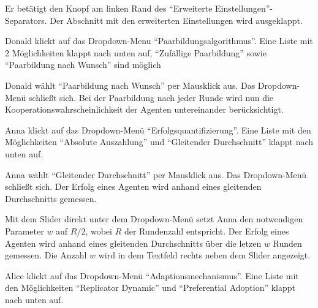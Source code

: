 \documentclass[parskip=full,11pt]{scrartcl}
\begin{document}

{Er betätigt den Knopf am linken Rand des \enquote{Erweiterte Einstellungen}-Separators.}
{Der Abschnitt mit den erweiterten Einstellungen wird ausgeklappt.}

{Donald klickt auf das Dropdown-Menu \enquote{Paarbildungsalgorithmus}.}
{Eine Liste mit 2 Möglichkeiten klappt nach unten auf, \enquote{Zufällige Paarbildung} sowie \enquote{Paarbildung nach Wunsch} sind möglich}

{Donald wählt  \enquote{Paarbildung nach Wunsch} per Mausklick aus.}
{Das Dropdown-Menü schließt sich. Bei der Paarbildung nach jeder Runde wird nun die Kooperationswahrscheinlichkeit der Agenten untereinander berücksichtigt.}


{Anna klickt auf das Dropdown-Menü \enquote{Erfolgsquantifizierung}.}
{Eine Liste mit den Möglichkeiten \enquote{Absolute Auszahlung} und  \enquote{Gleitender Durchschnitt} klappt nach unten auf.}

{Anna wählt \enquote{Gleitender Durchschnitt} per Mausklick aus.}
{Das Dropdown-Menü schließt sich. Der Erfolg eines Agenten wird anhand eines gleitenden Durchschnitts gemessen.}

{Mit dem Slider direkt unter dem Dropdown-Menü setzt Anna den notwendigen Parameter \(w\) auf \(R/2\), wobei \(R\) der Rundenzahl entspricht.}
{Der Erfolg eines Agenten wird anhand eines gleitenden Durchschnitts über die letzen \(w\) Runden gemessen. Die Anzahl \(w\) wird in dem Textfeld rechts neben dem Slider angezeigt.}


{Alice klickt auf das Dropdown-Menü \enquote{Adaptionsmechanismus}.}
{Eine Liste mit den Möglichkeiten \enquote{Replicator Dynamic} und  \enquote{Preferential Adoption} klappt nach unten auf.}
\end{document}
